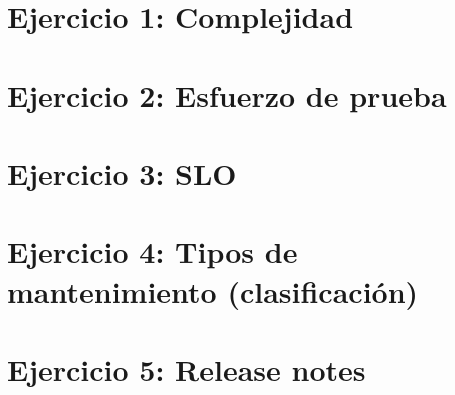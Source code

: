 

\section{Ejercicio 1: Complejidad}\label{sec:ejercicio-1:-complejidad}



\section{Ejercicio 2: Esfuerzo de prueba}\label{sec:ejercicio-2:-esfuerzo-de-prueba}



\section{Ejercicio 3: SLO}\label{sec:ejercicio-3:-slo}



\section{Ejercicio 4: Tipos de mantenimiento (clasificación)}\label{sec:ejercicio-4:-tipos-de-mantenimiento-(clasificacion)}



\section{Ejercicio 5: Release notes}\label{sec:ejercicio-5:-release-notes}

